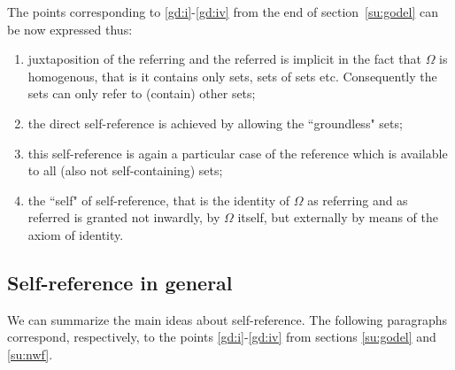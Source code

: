 The points corresponding to \ref{gd:i}-\ref{gd:iv} from the end of section~\ref{su:godel}
 can be now expressed thus:
\begin{enumerate}
\item \label{nwf:i}juxtaposition of the referring and the referred is implicit in the fact that $\Omega$ is homogenous, that is it contains only sets, sets of sets etc. Consequently the sets can only refer to (contain) other sets;
\item \label{nwf:ii}the direct self-reference is achieved by allowing the ``groundless" 
sets;
\item \label{nwf:iii}this self-reference is again a particular case of the reference which is available to all (also not self-containing) sets;
\item \label{nwf:iv}the ``self" of self-reference, that is the identity of $\Omega$ as referring and as referred is granted not inwardly, by $\Omega$ 
itself, but externally by means of the axiom of identity.
\end{enumerate}

\subsection{Self-reference in general}\label{su:general}

We can summarize the main ideas about self-reference. The following paragraphs correspond,
respectively, to the points \ref{gd:i}-\ref{gd:iv} from sections \ref{su:godel} and \ref{su:nwf}.

